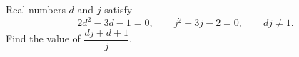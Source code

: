 Real numbers $d$ and $j$ satisfy
\[2d^2-3d-1=0,\qquad j^2+3j-2=0,\qquad dj\ne1.\]
Find the value of $\dfrac{dj+d+1}{j}$.
